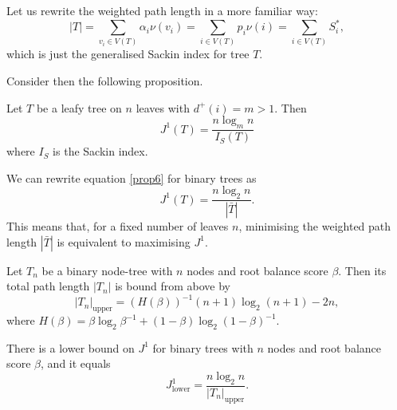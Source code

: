 \begin{remark}
    Let us rewrite the weighted path length in a more familiar way:
    \begin{equation*}
        |T| = \sum_{v_i \in V(T)} \alpha_i \nu(v_i) = \sum_{i \in V(T)} p_i \nu(i) = \sum_{i\in V(T)} S^*_i,
    \end{equation*}
    which is just the generalised Sackin index for tree $T$.
\end{remark}
Consider then the following proposition.
\begin{proposition}
    Let $T$ be a leafy tree on $n$ leaves with $d^+(i) = m > 1$. Then
    \begin{equation}
        J^1(T) = \frac{n\log_mn}{I_S(T)} \label{prop6}
    \end{equation}
    where $I_S$ is the Sackin index.
\end{proposition}
\begin{corollary}
    We can rewrite equation \eqref{prop6} for binary trees as
    \begin{equation}
        J^1(T) = \frac{n\log_2n}{|\bar{T}|}. \label{corr6}
    \end{equation}
    This means that, for a fixed number of leaves $n$, minimising the weighted path length $|\bar T|$ is equivalent to maximising $J^1$.
\end{corollary}

\begin{theorem}
    Let $T_n$ be a binary node-tree with $n$ nodes and root balance score $\beta$. Then its total path length $|T_n|$ is bound from above by
    \begin{equation}\label{path_upper_bound}
        |T_n|_\text{upper} = (H(\beta))^{-1}(n+1)\log_2(n+1)-2n,
    \end{equation}
    where $H(\beta) = \beta\log_2\beta^{-1}+(1-\beta)\log_2(1-\beta)^{-1}$.
\end{theorem}

\begin{corollary}\label{j1_lower_bound_cor}
    There is a lower bound on $J^1$ for binary trees with $n$ nodes and root balance score $\beta$, and it equals
    \begin{equation}\label{j1_lower_bound}
        J^1_\text{lower} = \frac{n\log_2n}{|T_n|_\text{upper}}.
    \end{equation}
\end{corollary}

